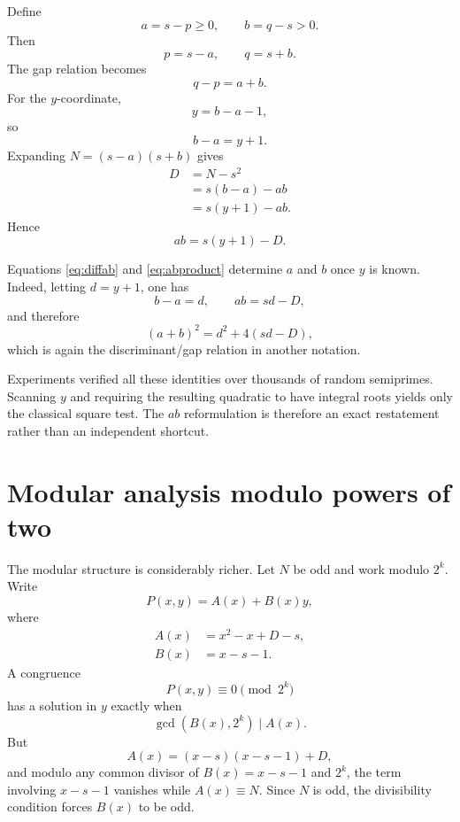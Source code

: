 \documentclass[11pt,a4paper]{article}
\begin{document}
Define
\begin{equation}
a=s-p\ge0,
\qquad
b=q-s>0.
\label{eq:ab}
\end{equation}
Then
\begin{equation}
p=s-a,
\qquad q=s+b.
\end{equation}
The gap relation becomes
\begin{equation}
q-p=a+b.
\end{equation}
For the \(y\)-coordinate,
\begin{equation}
\boxed{y=b-a-1,}
\label{eq:yab}
\end{equation}
so
\begin{equation}
\boxed{b-a=y+1.}
\label{eq:diffab}
\end{equation}
Expanding \(N=(s-a)(s+b)\) gives
\begin{align}
D
&=N-s^2\\
&=s(b-a)-ab\\
&=s(y+1)-ab.
\end{align}
Hence
\begin{equation}
\boxed{ab=s(y+1)-D.}
\label{eq:abproduct}
\end{equation}

Equations \eqref{eq:diffab} and \eqref{eq:abproduct} determine \(a\) and \(b\) once \(y\) is known. Indeed, letting \(d=y+1\), one has
\[
b-a=d,
\qquad ab=s d-D,
\]
and therefore
\begin{equation}
(a+b)^2=d^2+4(sd-D),
\end{equation}
which is again the discriminant/gap relation in another notation.

Experiments verified all these identities over thousands of random semiprimes. Scanning \(y\) and requiring the resulting quadratic to have integral roots yields only the classical square test. The \(ab\) reformulation is therefore an exact restatement rather than an independent shortcut.

\section{Modular analysis modulo powers of two}
\label{sec:mod2}

The modular structure is considerably richer. Let \(N\) be odd and work modulo \(2^k\). Write
\begin{equation}
P(x,y)=A(x)+B(x)y,
\end{equation}
where
\begin{align}
A(x)&=x^2-x+D-s,\\
B(x)&=x-s-1.
\end{align}
A congruence
\[
P(x,y)\equiv0\pmod{2^k}
\]
has a solution in \(y\) exactly when
\[
\gcd(B(x),2^k)\mid A(x).
\]
But
\begin{equation}
A(x)=(x-s)(x-s-1)+D,
\end{equation}
and modulo any common divisor of \(B(x)=x-s-1\) and \(2^k\), the term involving \(x-s-1\) vanishes while \(A(x)\equiv N\). Since \(N\) is odd, the divisibility condition forces \(B(x)\) to be odd.
\end{document}

